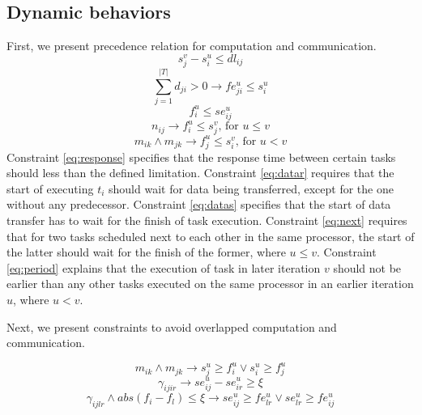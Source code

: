 \subsection{Dynamic behaviors}
First, we present precedence relation for computation and communication.
\begin{equation}\label{eq:response}
s^v_j-s^u_i\leq dl_{ij}
\end{equation}
\begin{equation}\label{eq:datar}
\sum^{|T|}_{j=1}d_{ji}>0 \rightarrow fe^u_{ji} \leq s^u_i
\end{equation}
\begin{equation}\label{eq:datas}
f^u_i\leq se^u_{ij}
\end{equation}
\begin{equation}\label{eq:next}
n_{ij} \rightarrow f^u_i \leq s^v_j \textrm{, for~} u\leq v
\end{equation}
\begin{equation}\label{eq:period}
m_{ik}\wedge m_{jk}  \rightarrow f^u_j \leq s^v_i \textrm{, for~} u<v
\end{equation}
Constraint \ref{eq:response} specifies that  the response time between certain tasks should less than the defined limitation.
Constraint \ref{eq:datar} requires that the start of executing $t_i$ should wait for data being transferred, except for the one without any predecessor.
Constraint \ref{eq:datas} specifies that the start of data transfer has to wait for the finish of task execution.
Constraint \ref{eq:next} requires that for two tasks scheduled next to each other in the same processor, the start of the latter should wait for the finish of the former, where $u\leq v$.
Constraint \ref{eq:period} explains that  the execution of task in later iteration $v$ should not be earlier than any other tasks executed on the same processor in an earlier iteration $u$, where $u<v$.

Next, we present constraints to avoid overlapped computation and communication. 

\begin{equation}\label{eq:overlap}
m_{ik}\wedge m_{jk} \rightarrow s^u_j\geq f^u_i \vee s^u_i\geq  f^u_j
\end{equation}
\begin{equation}\label{eq:samesource}
\gamma_{{i}{j}{i}{r}} \rightarrow se^u_{ij}-se^u_{ir}\geq \xi
\end{equation}
\begin{equation}\label{eq:linklap}
\gamma_{{i}{j}{l}{r}}\wedge abs(f_{i}-f_{l})\leq \xi \rightarrow se^u_{ij}\geq fe^u_{lr} \vee se^u_{lr}\geq  fe^u_{ij}
\end{equation}

